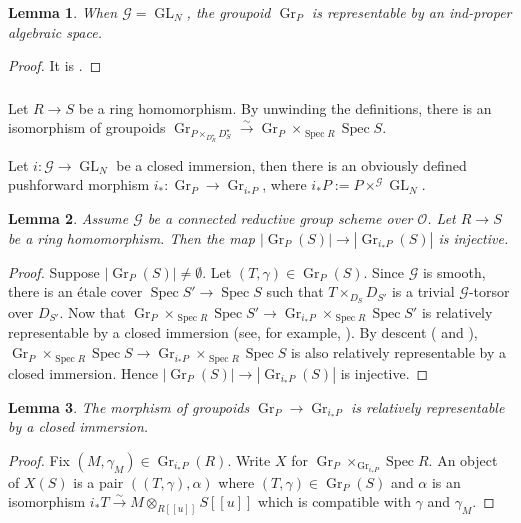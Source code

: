 \documentclass[11pt]{amsart}
\newtheorem{lem}{Lemma}
\numberwithin{thm}{section}
\numberwithin{lem}{section}
\numberwithin{cor}{section}
\numberwithin{prop}{section}
\numberwithin{exam}{section}
\numberwithin{dfn}{section}
\newcommand{\GR}{\operatorname{Gr}}
\newcommand{\GL}{\operatorname{GL}}
\newcommand{\spec}{\operatorname{Spec}}
\newcommand{\mysubsection}{\subsubsection}
\newcommand{\cO}{\mathcal{O}}
\newcommand{\cG}{\mathcal{G}}
\begin{document}
\begin{appendices}
\begin{lem}
When $\cG=\GL_N$,
the groupoid $\GR_P$ 
is representable by an ind-proper algebraic space.
\end{lem}

\begin{proof}
It is \cite[Proposition 3.8]{Dri06}.
\end{proof}

\mysubsection{}
Let $R\to S$ be a ring homomorphism.
By unwinding the definitions,
there is an isomorphism of groupoids
$\GR_{P\times_{D_R^\star}D_S^\star}\xrightarrow{\sim} \GR_P\times_{\spec R}\spec S$.

Let $i: \cG\to \GL_N$ be a closed immersion, then there is
an obviously defined pushforward morphism
$i_*:\GR_P \to \GR_{i_* P}$, where
$i_* P:= P\times^{\cG}\GL_N$.

\begin{lem}
\label{gr-lem1}
Assume $\cG$ be a connected reductive group scheme over $\cO$.
Let $R\to S$ be a ring homomorphism.
Then the map
$|\GR_P(S)| \to |\GR_{i_*P}(S)|$
is injective.
\end{lem}

\begin{proof}
Suppose $|\GR_P(S)|\ne \emptyset$.
Let $(T,\gamma)\in \GR_P(S)$.
Since $\cG$ is smooth, there is an \'etale cover $\spec S'\to \spec S$
such that $T\times_{D_S}D_{S'}$ is a trivial $\cG$-torsor over $D_{S'}$.
Now that $\GR_P\times_{\spec R}\spec S'\to \GR_{i_*P}\times_{\spec R}\spec S'$
is relatively representable by a closed immersion
(see, for example, \cite[Corollary 3.3.10]{Lev13}).
By descent (\cite[Tag 04SK]{Stacks} and \cite[Tag 0420]{Stacks}),
$\GR_P\times_{\spec R}\spec S\to \GR_{i_*P}\times_{\spec R}\spec S$
is also relatively representable by a closed immersion.
Hence
$|\GR_P(S)| \to |\GR_{i_*P}(S)|$
is injective.
\end{proof}

\begin{lem}
\label{gr-lem2}
The morphism of groupoids $\GR_P\to \GR_{i_*P}$
is relatively representable by a closed immersion.
\end{lem}

\begin{proof}
Fix $(M,\gamma_M)\in \GR_{i_*P}(R)$.
Write $X$ for $\GR_{P}\times_{\GR_{i_*P}}\spec R$.
An object of $X(S)$ is a pair $((T, \gamma), \alpha)$
where $(T,\gamma)\in \GR_P(S)$ and $\alpha$
is an isomorphism $i_*T \xrightarrow{\sim} M\otimes_{R[\![u]\!]}S[\![u]\!]$
which is compatible with $\gamma$ and $\gamma_M$.


\end{proof}
\end{appendices}
\end{document}
